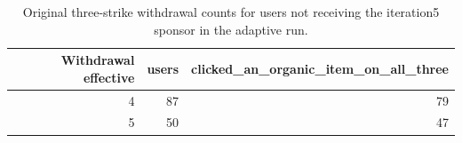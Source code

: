 \begin{table}[htbp!]
\centering
\small
\setlength{\tabcolsep}{3pt}
\renewcommand{\arraystretch}{1.1}
\begin{tabular}{rrr}
\hline
Withdrawal effective & users & clicked\_an\_organic\_item\_on\_all\_three \\
\hline
4 & 87 & 79 \\
5 & 50 & 47 \\
\hline
\end{tabular}
\caption{Original three-strike withdrawal counts for users not receiving the iteration5 sponsor in the adaptive run.}
\label{chap:results:tab:rq1_seed44_spike_withdrawals}
\end{table}
